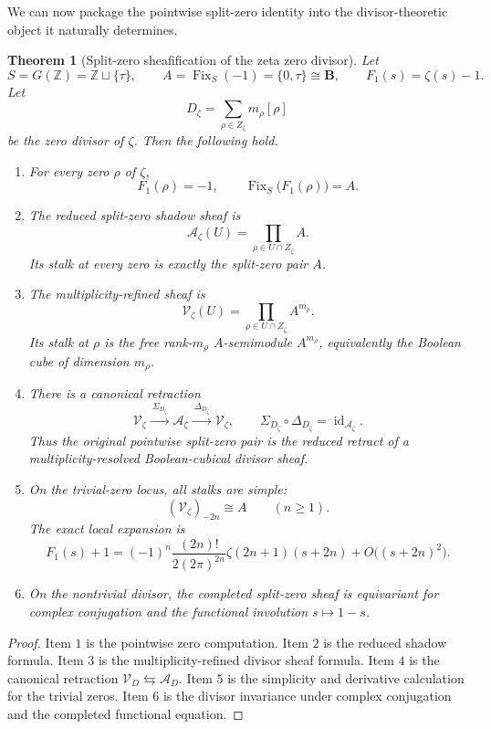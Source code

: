 \documentclass[11pt,a4paper]{article}
\newtheorem{theorem}{Theorem}[section]
\theoremstyle{definition}
\theoremstyle{remark}
\DeclareMathOperator{\Fix}{Fix}
\newcommand{\ZZ}{\mathbb Z}
\newcommand{\BB}{\mathbf B}
\begin{document}
We can now package the pointwise split-zero identity into the divisor-theoretic object it naturally determines.

\begin{theorem}[Split-zero sheafification of the zeta zero divisor]
Let
\[
S=G(\ZZ)=\ZZ\sqcup\{\tau\},
\qquad
A=\Fix_S(-1)=\{0,\tau\}\cong\BB,
\qquad
F_1(s)=\zeta(s)-1.
\]
Let
\[
D_\zeta=\sum_{\rho\in Z_\zeta}m_\rho[\rho]
\]
be the zero divisor of \(\zeta\). Then the following hold.

\begin{enumerate}[label=\textup{(\arabic*)}]
\item For every zero \(\rho\) of \(\zeta\),
\[
F_1(\rho)=-1,
\qquad
\Fix_S\bigl(F_1(\rho)\bigr)=A.
\]

\item The reduced split-zero shadow sheaf is
\[
\mathcal A_\zeta(U)=\prod_{\rho\in U\cap Z_\zeta}A.
\]
Its stalk at every zero is exactly the split-zero pair \(A\).

\item The multiplicity-refined sheaf is
\[
\mathcal V_\zeta(U)=\prod_{\rho\in U\cap Z_\zeta}A^{m_\rho}.
\]
Its stalk at \(\rho\) is the free rank-\(m_\rho\) \(A\)-semimodule \(A^{m_\rho}\), equivalently the Boolean cube of dimension \(m_\rho\).

\item There is a canonical retraction
\[
\mathcal V_\zeta\xrightarrow{\ \Sigma_{D_\zeta}\ }\mathcal A_\zeta
\xrightarrow{\ \Delta_{D_\zeta}\ }\mathcal V_\zeta,
\qquad
\Sigma_{D_\zeta}\circ\Delta_{D_\zeta}=\operatorname{id}_{\mathcal A_\zeta}.
\]
Thus the original pointwise split-zero pair is the reduced retract of a multiplicity-resolved Boolean-cubical divisor sheaf.

\item On the trivial-zero locus, all stalks are simple:
\[
(\mathcal V_\zeta)_{-2n}\cong A
\qquad (n\ge1).
\]
The exact local expansion is
\[
F_1(s)+1
=(-1)^n\frac{(2n)!}{2(2\pi)^{2n}}\zeta(2n+1)(s+2n)
+O\bigl((s+2n)^2\bigr).
\]

\item On the nontrivial divisor, the completed split-zero sheaf is equivariant for complex conjugation and the functional involution \(s\mapsto1-s\).
\end{enumerate}
\end{theorem}

\begin{proof}
Item \(1\) is the pointwise zero computation. Item \(2\) is the reduced shadow formula. Item \(3\) is the multiplicity-refined divisor sheaf formula. Item \(4\) is the canonical retraction \(\mathcal V_D\leftrightarrows\mathcal A_D\). Item \(5\) is the simplicity and derivative calculation for the trivial zeros. Item \(6\) is the divisor invariance under complex conjugation and the completed functional equation.
\end{proof}
\end{document}

